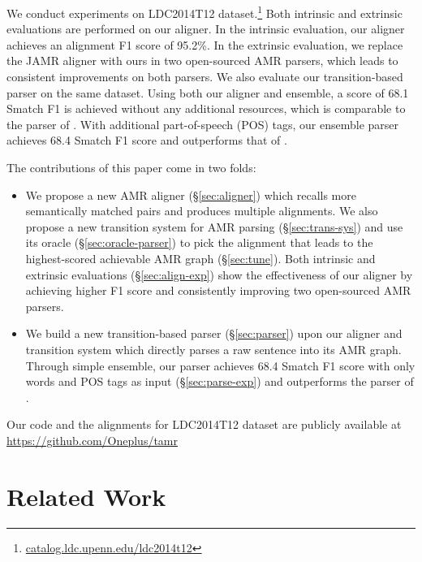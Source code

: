 \documentclass[11pt,a4paper]{article}
\begin{document}
We conduct experiments on LDC2014T12 dataset.\footnote{\url{catalog.ldc.upenn.edu/ldc2014t12}}
Both intrinsic and extrinsic evaluations are performed on our aligner.
In the intrinsic evaluation, our aligner achieves an alignment F1 score of 95.2\%.
In the extrinsic evaluation, we replace the JAMR aligner with ours
in two open-sourced AMR parsers, which leads to consistent improvements on both parsers.
We also evaluate our transition-based parser on the same dataset.
Using both our aligner and ensemble, a score of
68.1 Smatch F1 is achieved
without any additional resources, which is comparable to the parser of \citet{wang-xue:2017:EMNLP2017}.
With additional part-of-speech (POS) tags,
our ensemble parser
achieves 68.4 Smatch F1 score and
outperforms that of \citet{wang-xue:2017:EMNLP2017}.


The contributions of this paper come in two folds:

\begin{itemize}
	\item We propose a new AMR aligner (\S\ref{sec:aligner}) which recalls 
	more semantically matched pairs and produces multiple alignments.
	We also propose a new transition system for AMR parsing (\S\ref{sec:trans-sys}) and 
	use its oracle (\S\ref{sec:oracle-parser})
	to pick the alignment that leads to the highest-scored achievable AMR graph (\S\ref{sec:tune}).
	Both intrinsic and extrinsic evaluations (\S\ref{sec:align-exp}) show the effectiveness of our aligner
	by achieving higher F1 score and
	consistently improving two open-sourced AMR parsers.
	
	\item We build a new transition-based parser (\S\ref{sec:parser}) upon our aligner and transition system
	which directly parses a raw sentence into its AMR graph.
	Through simple ensemble, our parser achieves 68.4 Smatch F1 score with
	only words and POS tags as input (\S\ref{sec:parse-exp}) and outperforms the parser of \citet{wang-xue:2017:EMNLP2017}.
	
\end{itemize}


Our code and the alignments for LDC2014T12 dataset are publicly available at \url{https://github.com/Oneplus/tamr}

\section{Related Work}
\end{document}
